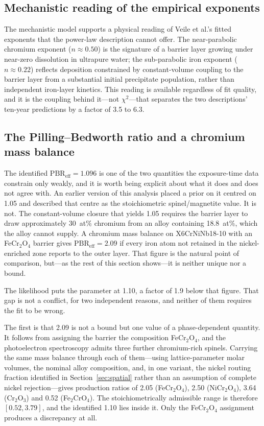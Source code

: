 \documentclass[preprint,12pt]{elsarticle}
\begin{document}
\subsection{Mechanistic reading of the empirical exponents}

The mechanistic model supports a physical reading of Veile et al.'s
fitted exponents that the power-law description cannot offer. The
near-parabolic chromium exponent ($n \approx 0.50$) is the signature of
a barrier layer growing under near-zero dissolution in ultrapure water;
the sub-parabolic iron exponent ($n \approx 0.22$) reflects deposition
constrained by constant-volume coupling to the barrier layer from a
substantial initial precipitate population, rather than independent
iron-layer kinetics. This reading is available regardless of fit
quality, and it is the coupling behind it---not $\chi^2$---that
separates the two descriptions' ten-year predictions by a factor of 3.5
to 6.3.

\subsection{The Pilling--Bedworth ratio and a chromium mass balance}

The identified $\mathrm{PBR}_\text{eff} = 1.096$ is one of the two
quantities the exposure-time data constrain only weakly, and it is worth
being explicit about what it does and does not agree with. An earlier
version of this analysis placed a prior on it centred on 1.05 and
described that centre as the stoichiometric spinel/magnetite value. It is
not. The constant-volume closure that yields 1.05 requires the barrier
layer to draw approximately 30~at\% chromium from an alloy containing
18.8~at\%, which the alloy cannot supply. A chromium mass balance on
X6CrNiNb18-10 with an FeCr$_2$O$_4$ barrier gives
$\mathrm{PBR}_\text{eff} = 2.09$ if every iron atom not retained in the
nickel-enriched zone reports to the outer layer. That figure is the
natural point of comparison, but---as the rest of this section
shows---it is neither unique nor a bound.

The likelihood puts the parameter at 1.10, a factor of 1.9 below that
figure. That gap is not a conflict, for two independent reasons, and
neither of them requires the fit to be wrong.

The first is that 2.09 is not a bound but one value of a
phase-dependent quantity. It follows from assigning the barrier the
composition FeCr$_2$O$_4$, and the photoelectron spectroscopy admits
three further chromium-rich spinels. Carrying the same mass balance
through each of them---using lattice-parameter molar volumes, the
nominal alloy composition, and, in one variant, the nickel routing
fraction identified in Section~\ref{sec:spatial} rather than an
assumption of complete nickel rejection---gives production ratios of
2.05 (FeCr$_2$O$_4$), 2.50 (NiCr$_2$O$_4$), 3.64 (Cr$_2$O$_3$) and 0.52
(Fe$_2$CrO$_4$). The stoichiometrically admissible range is therefore
$[0.52, 3.79]$, and the identified 1.10 lies inside it. Only the
FeCr$_2$O$_4$ assignment produces a discrepancy at all.
\end{document}
